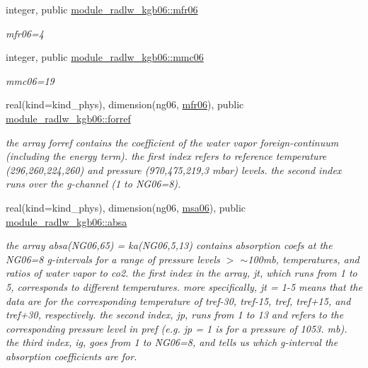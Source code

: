 \begin{DoxyCompactItemize}
\mbox{\label{group__module__radlw__kgbnn_gaaf1f13cdb5c2888b416a91e8b17e41d8}} 
integer, public \hyperlink{group__module__radlw__kgbnn_gaaf1f13cdb5c2888b416a91e8b17e41d8}{module\+\_\+radlw\+\_\+kgb06\+::mfr06}
\begin{DoxyCompactList}\small\item\em mfr06=4 \end{DoxyCompactList}\item 
\mbox{\label{group__module__radlw__kgbnn_gaf7a377cb66fd48348789c20f5a31dec6}} 
integer, public \hyperlink{group__module__radlw__kgbnn_gaf7a377cb66fd48348789c20f5a31dec6}{module\+\_\+radlw\+\_\+kgb06\+::mmc06}
\begin{DoxyCompactList}\small\item\em mmc06=19 \end{DoxyCompactList}\item 
\mbox{\label{group__module__radlw__kgbnn_ga6a0467b666bc75f90ae58fa4f58f07f0}} 
real(kind=kind\+\_\+phys), dimension(ng06, \hyperlink{group__module__radlw__kgbnn_gaaf1f13cdb5c2888b416a91e8b17e41d8}{mfr06}), public \hyperlink{group__module__radlw__kgbnn_ga6a0467b666bc75f90ae58fa4f58f07f0}{module\+\_\+radlw\+\_\+kgb06\+::forref}
\begin{DoxyCompactList}\small\item\em the array forref contains the coefficient of the water vapor foreign-\/continuum (including the energy term). the first index refers to reference temperature (296,260,224,260) and pressure (970,475,219,3 mbar) levels. the second index runs over the g-\/channel (1 to N\+G06=8). \end{DoxyCompactList}\item 
\mbox{\label{group__module__radlw__kgbnn_ga21bd40309855c89a64b88be171bfde59}} 
real(kind=kind\+\_\+phys), dimension(ng06, \hyperlink{namespacemodule__radlw__kgb06_add7b5d0d3ea44e1e677948c33e870333}{msa06}), public \hyperlink{group__module__radlw__kgbnn_ga21bd40309855c89a64b88be171bfde59}{module\+\_\+radlw\+\_\+kgb06\+::absa}
\begin{DoxyCompactList}\small\item\em the array absa(\+N\+G06,65) = ka(\+N\+G06,5,13) contains absorption coefs at the N\+G06=8 g-\/intervals for a range of pressure levels $>$ $\sim$100mb, temperatures, and ratios of water vapor to co2. the first index in the array, jt, which runs from 1 to 5, corresponds to different temperatures. more specifically, jt = 1-\/5 means that the data are for the corresponding temperature of tref-\/30, tref-\/15, tref, tref+15, and tref+30, respectively. the second index, jp, runs from 1 to 13 and refers to the corresponding pressure level in pref (e.\+g. jp = 1 is for a pressure of 1053. mb). the third index, ig, goes from 1 to N\+G06=8, and tells us which g-\/interval the absorption coefficients are for. \end{DoxyCompactList}\item 

\end{DoxyCompactItemize}
